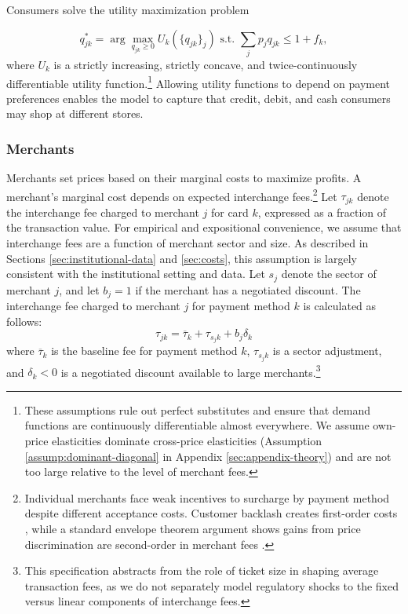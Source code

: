 \documentclass[11pt,english]{article}
\theoremstyle{remark}
\begin{document}
Consumers solve the utility maximization problem

\[q^{*}_{jk} = \arg\max_{q_{jk}\geq 0} U_k\left(\{q_{jk}\}_{j}\right) \text{ s.t. } \sum_j p_j q_{jk} \leq 1 + f_k,\]
where $U_k$ is a strictly increasing, strictly concave, and twice-continuously differentiable utility function.\footnote{ These assumptions rule out perfect substitutes and ensure that demand functions are continuously differentiable almost everywhere.
We assume own-price elasticities dominate cross-price elasticities (Assumption \ref{assump:dominant-diagonal} in Appendix \ref{sec:appendix-theory}) and are not too large relative to the level of merchant fees. } Allowing utility functions to depend on payment preferences enables the model to capture that credit, debit, and cash consumers may shop at different stores.

\subsubsection{Merchants}

Merchants set prices based on their marginal costs to maximize profits.
A merchant's marginal cost depends on expected interchange fees.\footnote{Individual merchants face weak incentives to surcharge by payment method despite different acceptance costs.
Customer backlash creates first-order costs \citep{Stavins2018,Caddy.etal2020}, while a standard envelope theorem argument shows gains from price discrimination are second-order in merchant fees \citep{Wang2025}.}
Let $\tau_{jk}$ denote the interchange fee charged to merchant $j$ for card $k$, expressed as a fraction of the transaction value.  For empirical and expositional convenience, we assume that interchange fees are a function of merchant sector and size. As described in Sections \ref{sec:institutional-data} and \ref{sec:costs}, this assumption is largely consistent with the institutional setting and data.
Let $s_j$ denote the sector of merchant $j$, and let $b_j = 1$ if the merchant has a negotiated discount. The interchange fee charged to merchant $j$ for payment method $k$ is calculated as follows:
\begin{equation}
\tau_{jk}=\overline{\tau}_{k}+\tau_{s_{j}k}+b_{j}\delta_{k}
\end{equation}
where $\overline{\tau}_{k}$ is the baseline fee for payment method $k$, $\tau_{s_{j}k}$ is a sector adjustment, and $\delta_{k}<0$ is a negotiated discount available to large merchants.\footnote{This specification abstracts from the role of ticket size in shaping average transaction fees, as we do not separately model regulatory shocks to the fixed versus linear components of interchange fees.}
\end{document}
